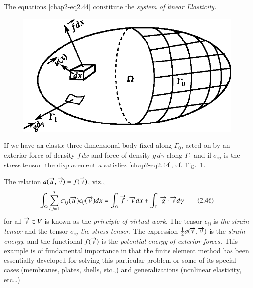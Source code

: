 \begin{example}
The equations \eqref{chap2-eq2.44} constitute the {\em system of
  linear Elasticity.}
\begin{figure}[H]
\centering
\includegraphics{figure/fig2.3.eps}
\caption{}\label{chap2-fig2.3}
\end{figure}\pageoriginale 

If we have an elastic three-dimensional body fixed along $\Gamma_{0}$,
acted on by an exterior force of density $f\,dx$ and force of density
$g\,d\gamma$ along $\Gamma_{1}$ and if $\sigma_{ij}$ is the stress
tensor, the displacement $u$ satisfies \eqref{chap2-eq2.44}; cf.\@
Fig.~\ref{chap2-fig2.3}. 

The relation $a(\overrightarrow{u},\overrightarrow{v})=f(\overrightarrow{v})$, viz.,
\begin{equation*}
\int_{\Omega}\sum^{3}_{i,j=1}\sigma_{ij}(\overrightarrow{u})\epsilon_{ij}(\overrightarrow{v})dx=\int_{\Omega}\overrightarrow{f}\cdot\overrightarrow{v}dx+\int_{\Gamma_{1}}\overrightarrow{g}\cdot\overrightarrow{v}d\gamma\tag{2.46}\label{chap2-eq2.46} 
\end{equation*}
for all $\overrightarrow{v}\in V$ is known as the {\em principle of virtual
  work}. The tensor $\epsilon_{ij}$ is {\em the strain tensor} and the
tensor $\sigma_{ij}$ {\em the stress tensor}. The expression
$\frac{1}{2}a(\overrightarrow{v},\overrightarrow{v})$ is the {\em strain energy}, and the
functional $f(\overrightarrow{v})$ is the {\em potential energy of exterior
  forces.} This example is of fundamental importance in that the
finite element method has been essentially developed for solving this
particular problem or some of its special cases (membranes, plates,
shells, etc.,) and generalizations (nonlinear elasticity, etc\ldots).
\end{example}

\eject


